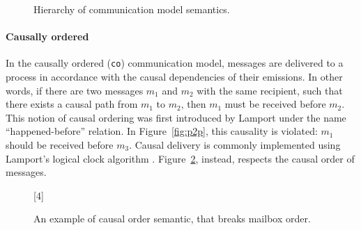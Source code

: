 \bigskip

\begin{figure}[!ht]
\centering
{}
\caption{Hierarchy of communication model semantics.}
\label{fig:coms}
\end{figure}

\paragraph{Causally ordered}
In the causally ordered (\verb|co|) communication model, messages are delivered 
to a process in accordance with the causal dependencies of their emissions. 
In other words, if there are two messages $m_1$ and $m_2$ with the same recipient, 
such that there exists a causal path from $m_1$ to $m_2$, then $m_1$ must be received 
before $m_2$. This notion of causal ordering was first introduced by Lamport under the 
name ``happened-before'' relation. In Figure~\ref{fig:p2p}, this 
causality is violated: $m_1$ should be received before $m_3$. Causal delivery 
is commonly implemented using Lamport's logical clock algorithm \cite{lamport2019time}.
Figure~\ref{fig:causalorder}, instead, respects the causal order of messages.

\begin{figure}[!ht]
	\centering
	\begin{msc}[draw frame=none, draw head=none, msc keyword=, 
				head height=0px, label distance=0.5ex, 
				foot height=0px, foot distance=0px]{}

		[4]
		\nextlevel
		\nextlevel
		\nextlevel
	\end{msc}
	\caption{An example of causal order semantic, that breaks mailbox order.}
	\label{fig:causalorder}
\end{figure}

